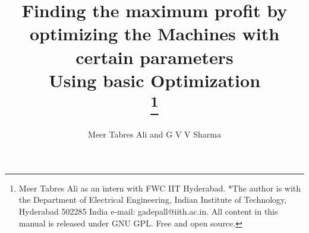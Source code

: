 \documentclass[journal,10pt,twocolumn]{article}
\begin{document}
\newtheorem{theorem}{Theorem}[section]
\newtheorem{problem}{Problem}
\newtheorem{proposition}{Proposition}[section]
\newtheorem{lemma}{Lemma}[section]
\newtheorem{corollary}[theorem]{Corollary}
\newtheorem{example}{Example}[section]
\newtheorem{definition}[problem]{Definition}
\newcommand{\BEQA}{\begin{eqnarray}}
\newcommand{\EEQA}{\end{eqnarray}}
\newcommand{\define}{\stackrel{\triangle}{=}}
\newcommand*\circled[1]{\tikz[baseline=(char.base)]{
    \node[shape=circle,draw,inner sep=2pt] (char) {#1};}}

%
\providecommand{\mbf}{\mathbf}
\providecommand{\pr}[1]{\ensuremath{\Pr\left(#1\right)}}
\providecommand{\re}[1]{\ensuremath{\text{Re}\left(#1\right)}}
\providecommand{\im}[1]{\ensuremath{\text{Im}\left(#1\right)}}
\providecommand{\qfunc}[1]{\ensuremath{Q\left(#1\right)}}
\providecommand{\sbrak}[1]{\ensuremath{{}\left[#1\right]}}
\providecommand{\lsbrak}[1]{\ensuremath{{}\left[#1\right.}}
\providecommand{\rsbrak}[1]{\ensuremath{{}\left.#1\right]}}
\providecommand{\brak}[1]{\ensuremath{\left(#1\right)}}
\providecommand{\lbrak}[1]{\ensuremath{\left(#1\right.}}
\providecommand{\rbrak}[1]{\ensuremath{\left.#1\right)}}
\providecommand{\cbrak}[1]{\ensuremath{\left\{#1\right\}}}
\providecommand{\lcbrak}[1]{\ensuremath{\left\{#1\right.}}
\providecommand{\rcbrak}[1]{\ensuremath{\left.#1\right\}}}
\newcommand{\sgn}{\mathop{\mathrm{sgn}}}
\providecommand{\system}{\overset{\mathcal{H}}{ \longleftrightarrow}}
\newcommand{\solution}{\noindent \textbf{Solution: }}
\newcommand{\cosec}{\,\text{cosec}\,}
\providecommand{\dec}[2]{\ensuremath{\overset{#1}{\underset{#2}{\gtrless}}}}
\newcommand{\myvec}[1]{\ensuremath{\begin{pmatrix}#1\end{pmatrix}}}
\newcommand{\mydet}[1]{\ensuremath{\begin{vmatrix}#1\end{vmatrix}}}
	\newcommand*{\permcomb}[4][0mu]{{{}^{#3}\mkern#1#2_{#4}}}
\newcommand*{\perm}[1][-3mu]{\permcomb[#1]{P}}
\newcommand*{\comb}[1][-1mu]{\permcomb[#1]{C}}
\let\vec\mathbf
\title{
{Finding the maximum profit by optimizing the Machines with certain parameters\\
Using basic Optimization}\\

\thanks {Meer Tabres Ali as an intern with FWC IIT Hyderabad. *The author is with the Department of Electrical Engineering, Indian Institute of Technology, Hyderabad 502285 India e-mail: gadepall@iith.ac.in. All content in this manual is released under GNU GPL. Free and open source.}
}
\author{Meer Tabres Ali and G V V Sharma}
\maketitle
\tableofcontents
\end{document}
